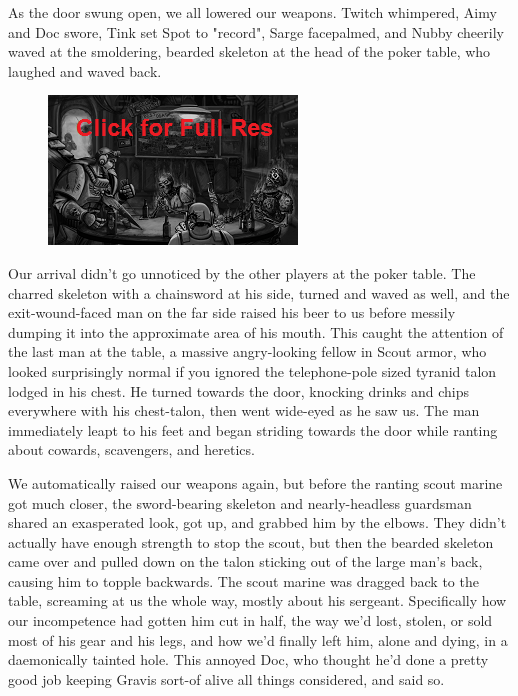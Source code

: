As the door swung open, we all lowered our weapons. 
Twitch whimpered, Aimy and Doc swore, Tink set Spot to "record", Sarge facepalmed, and Nubby cheerily waved at the smoldering, bearded skeleton at the head of the poker table, who laughed and waved back.

\begin{figure}
	\begin{center}
		\includegraphics[width=\figwidth]{pics/15/59.png}
	\end{center}
\end{figure}
Our arrival didn't go unnoticed by the other players at the poker table. 
The charred skeleton with a chainsword at his side, turned and waved as well, and the exit-wound-faced man on the far side raised his beer to us before messily dumping it into the approximate area of his mouth. 
This caught the attention of the last man at the table, a massive angry-looking fellow in Scout armor, who looked surprisingly normal if you ignored the telephone-pole sized tyranid talon lodged in his chest. 
He turned towards the door, knocking drinks and chips everywhere with his chest-talon, then went wide-eyed as he saw us. 
The man immediately leapt to his feet and began striding towards the door while ranting about cowards, scavengers, and heretics.

We automatically raised our weapons again, but before the ranting scout marine got much closer, the sword-bearing skeleton and nearly-headless guardsman shared an exasperated look, got up, and grabbed him by the elbows. 
They didn't actually have enough strength to stop the scout, but then the bearded skeleton came over and pulled down on the talon sticking out of the large man's back, causing him to topple backwards. 
The scout marine was dragged back to the table, screaming at us the whole way, mostly about his sergeant. 
Specifically how our incompetence had gotten him cut in half, the way we'd lost, stolen, or sold most of his gear and his legs, and how we'd finally left him, alone and dying, in a daemonically tainted hole. 
This annoyed Doc, who thought he'd done a pretty good job keeping Gravis sort-of alive all things considered, and said so.

